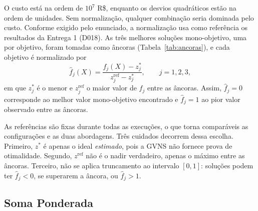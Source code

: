 \documentclass[10pt,twocolumn,a4paper]{article}
\begin{document}
O custo está na ordem de $10^7$ R\$, enquanto os desvios quadráticos estão na ordem de unidades. Sem normalização, qualquer combinação seria dominada pelo custo. Conforme exigido pelo enunciado, a normalização usa como referência os resultados da Entrega 1 (D018). As três melhores soluções mono-objetivo, uma por objetivo, foram tomadas como âncoras (Tabela~\ref{tab:ancoras}), e cada objetivo é normalizado por
\begin{equation}
\hat f_j(X) = \frac{f_j(X) - z_j^*}{z_j^{\text{ref}} - z_j^*}, \qquad j = 1, 2, 3,
\end{equation}
em que $z_j^*$ é o menor e $z_j^{\text{ref}}$ o maior valor de $f_j$ entre as âncoras. Assim, $\hat f_j = 0$ corresponde ao melhor valor mono-objetivo encontrado e $\hat f_j = 1$ ao pior valor observado entre as âncoras.

\begin{table}[H]
\centering
\caption{Soluções-âncora da Entrega 1 (seed 2018) e referências de normalização.}
\label{tab:ancoras}
\end{table}

As referências são fixas durante todas as execuções, o que torna comparáveis as configurações e as duas abordagens. Três cuidados decorrem dessa escolha. Primeiro, $z^*$ é apenas o ideal \emph{estimado}, pois a GVNS não fornece prova de otimalidade. Segundo, $z^{\text{ref}}$ não é o nadir verdadeiro, apenas o máximo entre as âncoras. Terceiro, não se aplica truncamento ao intervalo $[0, 1]$: soluções podem ter $\hat f_j < 0$, se superarem a âncora, ou $\hat f_j > 1$.

\subsection{Soma Ponderada}
\end{document}
